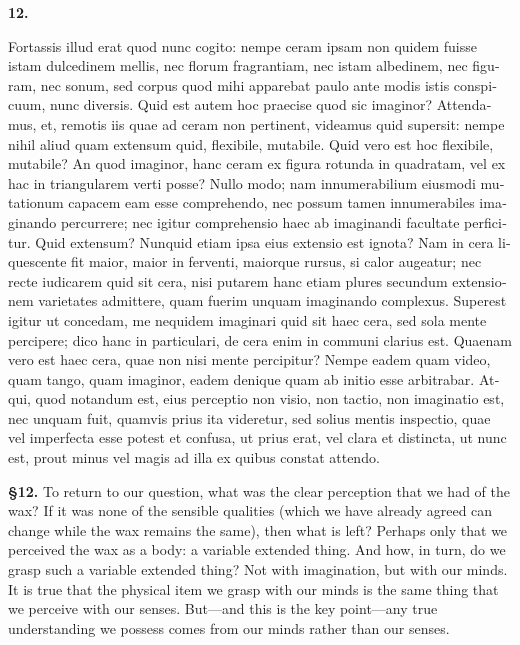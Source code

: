\beginnumbering
\pstart
    \textbf{12.} \begin{latin}Fortassis illud erat quod nunc cogito: nempe ceram ipsam non quidem fuisse istam dulcedinem mellis, nec florum fragrantiam, nec istam albedinem, nec figuram, nec sonum, sed corpus quod mihi apparebat paulo ante modis istis conspicuum, nunc diversis. Quid est autem hoc praecise quod sic imaginor? Attendamus, et, remotis iis quae ad ceram non pertinent, videamus quid supersit: nempe nihil aliud quam extensum quid, flexibile, mutabile. Quid vero est hoc flexibile, mutabile? An quod imaginor, hanc ceram ex figura rotunda in quadratam, vel ex hac in triangularem verti posse? Nullo modo; nam innumerabilium eiusmodi mutationum capacem eam esse comprehendo, nec possum tamen innumerabiles imaginando percurrere; nec igitur comprehensio haec ab imaginandi facultate perficitur. Quid extensum? Nunquid etiam ipsa eius extensio est ignota? Nam in cera liquescente fit maior, maior in ferventi, maiorque rursus, si calor augeatur; nec recte iudicarem quid sit cera, nisi putarem hanc etiam plures secundum extensionem varietates admittere, quam fuerim unquam imaginando complexus. Superest igitur ut concedam, me nequidem imaginari quid sit haec cera, sed sola mente percipere; dico hanc in particulari, de cera enim in communi clarius est. Quaenam vero est haec cera, quae non nisi mente percipitur? Nempe eadem quam video, quam tango, quam imaginor, eadem denique quam ab initio esse arbitrabar. Atqui, quod notandum est, eius perceptio non visio, non tactio, non imaginatio est, nec unquam fuit, quamvis prius ita videretur, sed solius mentis inspectio, quae vel imperfecta esse potest et confusa, ut prius erat, vel clara et distincta, ut nunc est, prout minus vel magis ad illa ex quibus constat attendo.\end{latin}
\pend
\endnumbering

\prenotes

\textbf{§12.} To return to our question, what was the clear perception that we had of the wax? If it was none of the sensible qualities (which we have already agreed can change while the wax remains the same), then what is left? Perhaps only that we perceived the wax as a body: a variable extended thing. And how, in turn, do we grasp such a variable extended thing? Not with imagination, but with our minds. It is true that the physical item we grasp with our minds is the same thing that we perceive with our senses. But---and this is the key point---any true understanding we possess comes from our minds rather than our senses.

